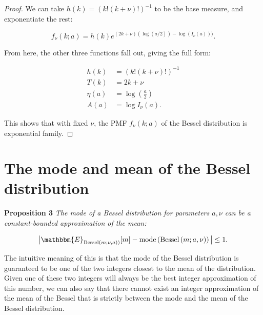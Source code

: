 \documentclass{article}
\newcommand{\Bess}[1]{\textup{Bessel}\left( #1 \right)}
\begin{document}
\begin{proof}
   We can take $h(k) = (k!(k + \nu)!)^{-1}$ to be the base measure,
   and exponentiate the rest:
   
   \begin{equation}
       f_{\nu}(k; a) = h(k) e^{(2k + \nu)(\log(a/2)) - \log(I_{\nu}(a)))}.
   \end{equation}
   
   From here, the other three functions fall out, giving the full form:
   
   \begin{align}
     h(k) &= (k!(k + \nu)!)^{-1} \\
     T(k) &= 2k + \nu \\
     \eta(a) &= \log\left(\frac{a}{2}\right) \\
     A(a) &= \log I_\nu(a).
   \end{align}
   
   This shows that with fixed $\nu$, the PMF $f_{\nu}(k; a)$ of the Bessel distribution is exponential family.
\end{proof}
  
\section{The mode and mean of the Bessel distribution}
\label{sec:besselmode}

\textbf{Proposition 3}
  \label{theorem:besselmode}
  \textit{The mode of a Bessel distribution for parameters $a, \nu$ can be a constant-bounded approximation of the mean:}

\[
  \big| \mathbbm{E}_{\Bess{m; \nu, a})}[m]  - \textup{mode} \left(\Bess{m; a, \nu} \right) \big|  \leq 1.  
\]

The intuitive meaning of this is that the mode of the Bessel distribution is
guaranteed to be one of the two integers closest to the mean of the
distribution. Given one of these two integers will always be the best integer
approximation of this number, we can also say that there cannot exist an
integer approximation of the mean of the Bessel that is strictly between the
mode and the mean of the Bessel distribution.
\end{document}
